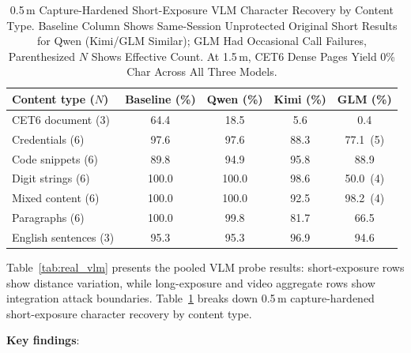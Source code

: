 \documentclass{ieeeaccess}
\begin{document}
\begin{table}[!t]
\caption{0.5\,m Capture-Hardened Short-Exposure VLM Character Recovery by Content Type. Baseline Column Shows Same-Session Unprotected Original Short Results for Qwen (Kimi/GLM Similar); GLM Had Occasional Call Failures, Parenthesized $N$ Shows Effective Count. At 1.5\,m, CET6 Dense Pages Yield 0\% Char Across All Three Models.}
\label{tab:vlm_content}
\centering
\footnotesize
\setlength{\tabcolsep}{2.8pt}
\begin{tabular}{lcccc}
\toprule
Content type ($N$) & Baseline (\%) & Qwen (\%) & Kimi (\%) & GLM (\%) \\
\midrule
CET6 document (3) & 64.4 & 18.5 & 5.6 & 0.4 \\
Credentials (6) & 97.6 & 97.6 & 88.3 & 77.1~(5) \\
Code snippets (6) & 89.8 & 94.9 & 95.8 & 88.9 \\
Digit strings (6) & 100.0 & 100.0 & 98.6 & 50.0~(4) \\
Mixed content (6) & 100.0 & 100.0 & 92.5 & 98.2~(4) \\
Paragraphs (6) & 100.0 & 99.8 & 81.7 & 66.5 \\
English sentences (3) & 95.3 & 95.3 & 96.9 & 94.6 \\
\bottomrule
\end{tabular}
\end{table}

Table~\ref{tab:real_vlm} presents the pooled VLM probe results: short-exposure rows show distance variation, while long-exposure and video aggregate rows show integration attack boundaries. Table~\ref{tab:vlm_content} breaks down 0.5\,m capture-hardened short-exposure character recovery by content type.

\textbf{Key findings}:
\end{document}
